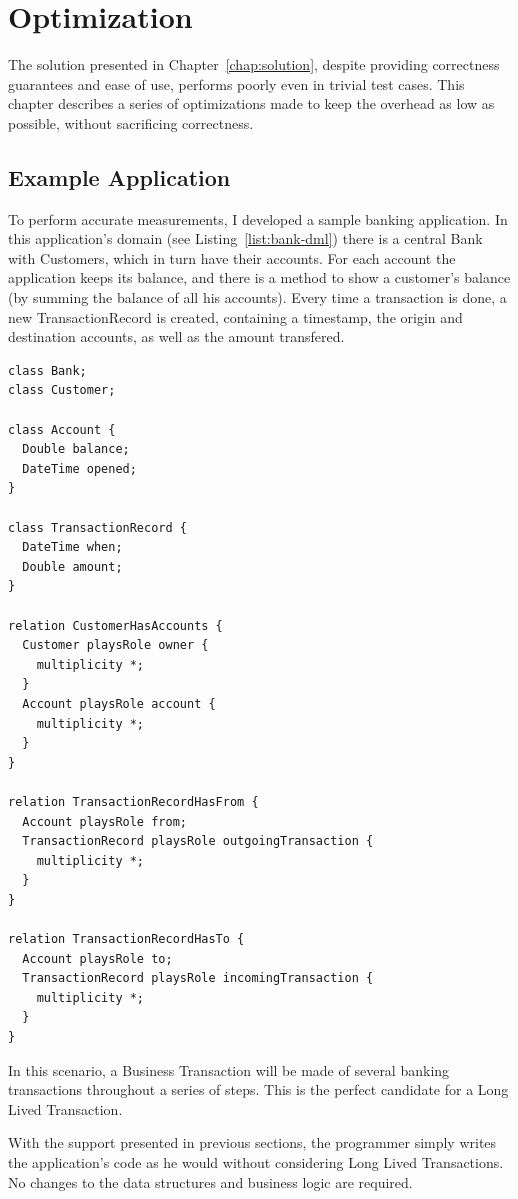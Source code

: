 \chapter{Optimization}

The solution presented in Chapter~\ref{chap:solution}, despite
providing correctness guarantees and ease of use, performs poorly even
in trivial test cases. This chapter describes a series of
optimizations made to keep the overhead as low as possible, without
sacrificing correctness.

\section{Example Application}

To perform accurate measurements, I developed a sample banking
application. In this application's domain (see
Listing~\ref{list:bank-dml}) there is a central Bank with Customers,
which in turn have their accounts. For each account the application
keeps its balance, and there is a method to show a
customer's balance (by summing the balance of all his accounts). Every
time a transaction is done, a new TransactionRecord is created,
containing a timestamp, the origin and destination accounts, as well
as the amount transfered.

\begin{lstlisting}[caption={Domain Model for the Banking Application},
  label={list:bank-dml}]
class Bank;
class Customer;

class Account {
  Double balance;
  DateTime opened;
}

class TransactionRecord {
  DateTime when;
  Double amount;
}

relation CustomerHasAccounts {
  Customer playsRole owner {
    multiplicity *;
  }
  Account playsRole account {
    multiplicity *;
  }
}

relation TransactionRecordHasFrom {
  Account playsRole from;
  TransactionRecord playsRole outgoingTransaction {
    multiplicity *;
  }
}

relation TransactionRecordHasTo {
  Account playsRole to;
  TransactionRecord playsRole incomingTransaction {
    multiplicity *;
  }
}
\end{lstlisting}

In this scenario, a Business Transaction will be made of several
banking transactions throughout a series of steps. This is the perfect
candidate for a Long Lived Transaction.

With the support presented in previous sections, the programmer simply
writes the application's code as he would without considering Long
Lived Transactions. No changes to the data structures and business
logic are required.

